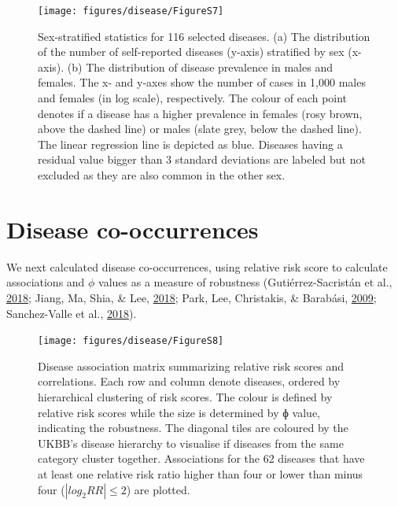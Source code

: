 \documentclass[12pt,twoside]{unicam}
\begin{document}
\begin{figure}

{\centering \texttt{[image: figures/disease/FigureS7]} 

}

\caption[Sex-stratified statistics for the 116 diseases.]{Sex-stratified statistics for 116 selected diseases. (a) The distribution of the number of self-reported diseases (y-axis) stratified by sex (x-axis). (b) The distribution of disease prevalence in males and females. The x- and y-axes show the number of cases in 1,000 males and females (in log scale), respectively. The colour of each point denotes if a disease has a higher prevalence in females (rosy brown, above the dashed line) or males (slate grey, below the dashed line). The linear regression line is depicted as blue. Diseases having a residual value bigger than 3 standard deviations are labeled but not excluded as they are also common in the other sex.}\label{fig:disFigS7}
\end{figure}

\hypertarget{disease-co-occurrences}{%
\section{Disease co-occurrences}\label{disease-co-occurrences}}

We next calculated disease co-occurrences, using relative risk score to calculate associations and \(\phi\) values as a measure of robustness (Gutiérrez-Sacristán et al., \protect\hyperlink{ref-Gutierrez-Sacristan2018}{2018}; Jiang, Ma, Shia, \& Lee, \protect\hyperlink{ref-Jiang2018}{2018}; Park, Lee, Christakis, \& Barabási, \protect\hyperlink{ref-Park2009}{2009}; Sanchez-Valle et al., \protect\hyperlink{ref-Sanchez-Valle2018}{2018}).

\begin{figure}

{\centering \texttt{[image: figures/disease/FigureS8]} 

}

\caption[Disease association matrix summarizing relative risk scores and correlations.]{Disease association matrix summarizing relative risk scores and correlations. Each row and column denote diseases, ordered by hierarchical clustering of risk scores. The colour is defined by relative risk scores while the size is determined by ɸ value, indicating the robustness. The diagonal tiles are coloured by the UKBB's disease hierarchy to visualise if diseases from the same category cluster together. Associations for the 62 diseases that have at least one relative risk ratio higher than four or lower than minus four ($|log_2RR| ≤ 2$) are plotted.}\label{fig:disFigS8}
\end{figure}
\end{document}

